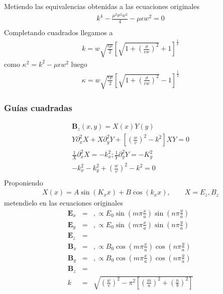 Metiendo las equivalencias obtenidas a las ecuaciones originales 
\begin{subequations}
	\begin{eqnarray}
	k^4 - \frac{\mu^2 \sigma^2 w^2}{4} - \mu \epsilon w^2=0 \nonumber\\
	\end{eqnarray}
\end{subequations}
Completando cuadrados llegamos a 
\begin{subequations}
	\begin{eqnarray}
	k= w \sqrt{\frac{\epsilon \mu}{2}} \left[\sqrt{1+\left(\frac{\sigma}{\epsilon w} \right)^2}+1 \right]^\frac{1}{2}
	\end{eqnarray}
\end{subequations}
como $\kappa^2 = k^2 - \mu \epsilon w^2$ luego
\begin{subequations}
	\begin{eqnarray}
	\kappa = w \sqrt{\frac{\epsilon \mu}{2}} \left[\sqrt{1 + \left(\frac{\sigma}{\epsilon w} \right)^2}-1\right]^\frac{1}{2}
	\end{eqnarray}
\end{subequations}
\subsubsection{Guías cuadradas}
\begin{eqnarray}
	\mathbf{B}_{z}(x,y)=X(x)Y(y) \nonumber \\
	Y \partial_{x}^2 X+X \partial_{y}^2Y + [(\frac{w}{v})^2-k^2]XY=0 \nonumber \\
	\frac{1}{X} \partial_{x}^2 X=-k_{x}^2 ; \frac{1}{Y}\partial_{y}^2 Y = -K_{y}^2 \nonumber \\
	-k_{x}^2 - k_{y}^2+(\frac{w}{v})^2 - k^2 = 0 \nonumber\\
		\end{eqnarray}
	Proponiendo  
		\begin{eqnarray}
	X(x)=A \sin (K_{x} x) + B \cos(k_{x}x)  , \qquad  X= E_{z},B_{z}
\end{eqnarray}
	metendielo en las ecuaciones originales
	\begin{eqnarray}
	\mathbf{E}_{x}&=&, \propto E_{0} \sin(m \pi \frac{x}{a}) \sin(n \pi \frac{y}{a})\\
	\mathbf{E}_{y}&=&, \propto E_{0} \sin(m \pi \frac{x}{a}) \sin(n \pi \frac{y}{a})\\
	\mathbf{E}_{z}&=& \\
	\mathbf{B}_{x}&=& , \propto B_{0} \cos(m \pi \frac{x}{a}) \cos(n \pi \frac{y}{a}) \\
	\mathbf{B}_{y}&=& , \propto B_{0} \cos(m \pi \frac{x}{a}) \cos(n \pi \frac{y}{a}) \\
	\mathbf{B}_{z}&=&  \\
	k &=& \sqrt{(\frac{w}{v})^2-\pi^2 [(\frac{m}{a})^2+(\frac{n}{b})^2]} 
\end{eqnarray}
